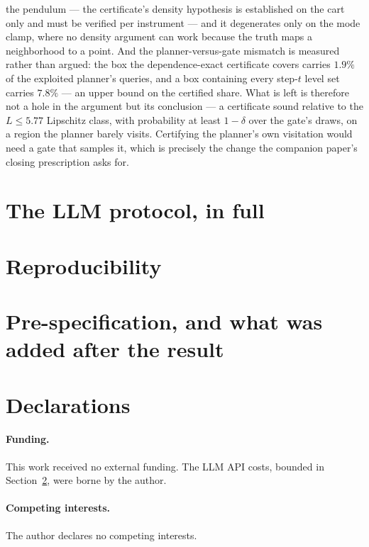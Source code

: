 \documentclass[11pt]{article}
\theoremstyle{definition}
\theoremstyle{remark}
\begin{document}
the pendulum --- the certificate's density hypothesis is established on the cart only and must be verified per instrument --- and it degenerates only on the mode clamp, where no density argument can work because the truth maps a neighborhood to a point. And the planner-versus-gate mismatch is measured rather than argued: the box the dependence-exact certificate covers carries $1.9\%$ of the exploited planner's queries, and a box containing every step-$t$ level set carries $7.8\%$ --- an upper bound on the certified share. What is left is therefore not a hole in the argument but its conclusion --- a certificate sound relative to the $L \leq 5.77$ Lipschitz class, with probability at least $1-\delta$ over the gate's draws, on a region the planner barely visits. Certifying the planner's own visitation would need a gate that samples it, which is precisely the change the companion paper's closing prescription asks for.


\section{The LLM protocol, in full}
\label{sup:protocol}


\section{Reproducibility}
\label{sup:repro}


\section{Pre-specification, and what was added after the result}
\label{sup:prespec}


\section*{Declarations}

\paragraph{Funding.} This work received no external funding. The LLM API costs, bounded in
Section~\ref{sup:repro}, were borne by the author.

\paragraph{Competing interests.} The author declares no competing interests.
\end{document}
